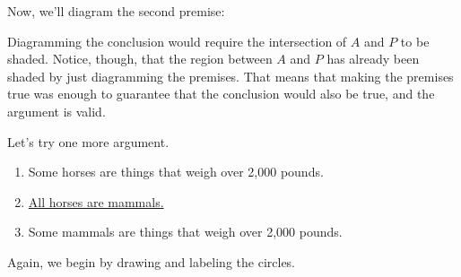 Now, we'll diagram the second premise:

\medskip
{}

Diagramming the conclusion would require the intersection of $A$ and $P$ to be shaded. Notice, though, that the region between $A$ and $P$ has already been shaded by just diagramming the premises. That means that making the premises true was enough to guarantee that the conclusion would also be true, and the argument is valid.


Let's try one more argument.

\begin{enumerate}
\item Some horses are things that weigh over 2,000 pounds.
\item \underline{All horses are mammals.}
\item Some mammals are things that weigh over 2,000 pounds.
\end{enumerate}

Again, we begin by drawing and labeling the circles.

\medskip
{}


